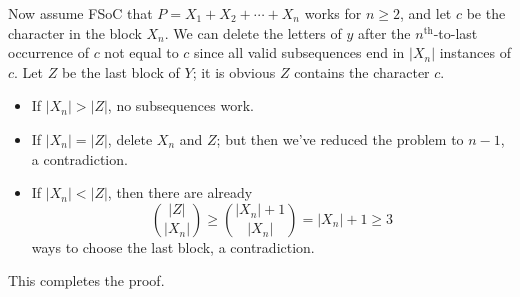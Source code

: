 Now assume FSoC that $P=X_1+X_2+\cdots+X_n$ works for $n\ge2$, and let $c$ be the character in the block $X_n$. We can delete the letters of $y$ after the $n^\text{th}$-to-last occurrence of $c$ not equal to  $c$ since all valid subsequences end in $|X_n|$ instances of $c$. Let $Z$ be the last block of $Y$; it is obvious $Z$ contains the character $c$.
\begin{itemize}[itemsep=0em]
    \item If $|X_n|>|Z|$, no subsequences work.
    \item If $|X_n|=|Z|$, delete $X_n$ and $Z$; but then we've reduced the problem to $n-1$, a contradiction.
    \item If $|X_n|<|Z|$, then there are already \[\binom{|Z|}{|X_n|}\ge\binom{|X_n|+1}{|X_n|}=|X_n|+1\ge 3\]
        ways to choose the last block, a contradiction.
\end{itemize}
This completes the proof.
